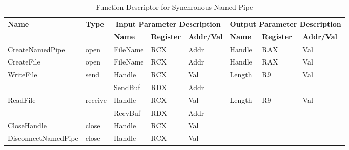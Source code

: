\begin{table}[H]
  \centering
  \caption{Function Descriptor for Synchronous Named Pipe}
  \label{namesyn}
  \begin{tabular}{|l|l|l|l|l|l|l|l|}
\hline
             \multirow{2}{*}{{\textbf{Name}}} & \multirow{2}{*}{{\textbf{Type}}} & \multicolumn{3}{c|}{\textbf{Input Parameter Description}} & \multicolumn{3}{c|}{\textbf{Output Parameter Description}} \\
              \cline{3-8} 
             & & \textbf{Name}& \textbf{Register} & \textbf{Addr/Val} & \textbf{Name}& \textbf{Register} &  \textbf{Addr/Val}  \\
             \hline
      CreateNamedPipe
       &open & FileName & RCX  & Addr &  Handle & RAX & Val\\
      \hline         
      CreateFile
       &open & FileName & RCX & Addr&  Handle & RAX & Val\\ 
      \hline              
      \multirow{2}{*}{WriteFile}
       &\multirow{2}{*}{send} &  Handle & RCX & Val & \multirow{2}{*}{Length} & \multirow{2}{*}{R9} & \multirow{2}{*}{Val}\\
        \cline{3-5} 
       & & SendBuf & RDX & Addr & & &\\
      \hline            
      \multirow{2}{*}{ReadFile}
       &\multirow{2}{*}{receive} &  Handle & RCX & Val& \multirow{2}{*}{Length} & \multirow{2}{*}{R9} & \multirow{2}{*}{Val}\\
        \cline{3-5} 
       & & RecvBuf & RDX  & Addr & & &\\
      \hline            
      CloseHandle &
       close &  Handle & RCX & Val & & &\\
      \hline            
      DisconnectNamedPipe &
      close &  Handle & RCX & Val & & &\\
      \hline               
  \end{tabular}
\end{table}

